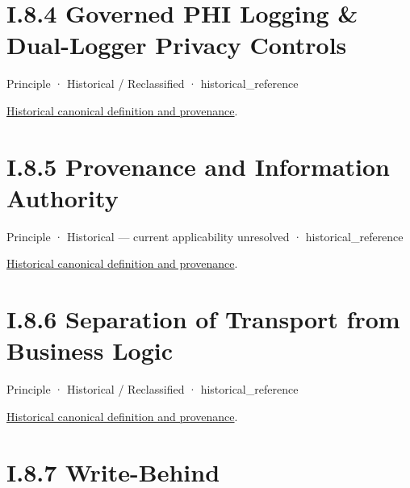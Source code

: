 \section*{I.8.4 Governed PHI Logging \& Dual-Logger Privacy Controls}
\label{navigation:I.8.4}

\label{element:96ed278624c34ba4bfade0df08d45d74}
{\small Principle · Historical / Reclassified · historical\_reference}\par
\href{../../../../../../../continuum/motivation/principle/96ed278624c34ba4bfade0df08d45d74.md}{Historical canonical definition and provenance}.\par
\section*{I.8.5 Provenance and Information Authority}
\label{navigation:I.8.5}

\label{element:638c501ba4df4c67aee92d1f328aad84}
{\small Principle · Historical — current applicability unresolved · historical\_reference}\par
\href{../../../../../../../continuum/motivation/principle/638c501ba4df4c67aee92d1f328aad84.md}{Historical canonical definition and provenance}.\par
\section*{I.8.6 Separation of Transport from Business Logic}
\label{navigation:I.8.6}

\label{element:5ae28648334e4f6184044af0462eb9a8}
{\small Principle · Historical / Reclassified · historical\_reference}\par
\href{../../../../../../../continuum/motivation/principle/5ae28648334e4f6184044af0462eb9a8.md}{Historical canonical definition and provenance}.\par
\section*{I.8.7 Write-Behind}
\label{navigation:I.8.7}


